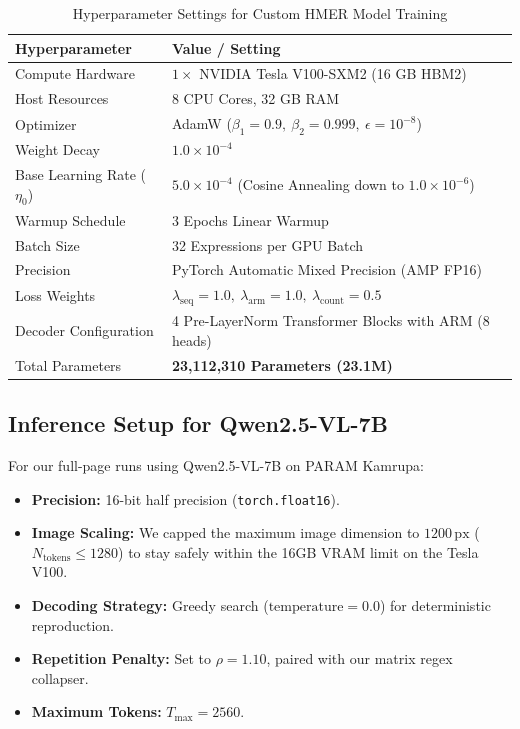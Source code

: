 \begin{table}[htbp]
\centering
\caption{Hyperparameter Settings for Custom HMER Model Training}
\label{tab:training_hyperparams}
\vspace{0.2cm}
\small
\begin{tabular}{ll}
\toprule
\textbf{Hyperparameter} & \textbf{Value / Setting} \\
\midrule
Compute Hardware & $1 \times$ NVIDIA Tesla V100-SXM2 (16 GB HBM2) \\
Host Resources & 8 CPU Cores, 32 GB RAM \\
Optimizer & AdamW ($\beta_1 = 0.9, \ \beta_2 = 0.999, \ \epsilon = 10^{-8}$) \\
Weight Decay & $1.0 \times 10^{-4}$ \\
Base Learning Rate ($\eta_0$) & $5.0 \times 10^{-4}$ (Cosine Annealing down to $1.0 \times 10^{-6}$) \\
Warmup Schedule & 3 Epochs Linear Warmup \\
Batch Size & 32 Expressions per GPU Batch \\
Precision & PyTorch Automatic Mixed Precision (AMP FP16) \\
Loss Weights & $\lambda_{\text{seq}} = 1.0, \ \lambda_{\text{arm}} = 1.0, \ \lambda_{\text{count}} = 0.5$ \\
Decoder Configuration & 4 Pre-LayerNorm Transformer Blocks with ARM (8 heads) \\
Total Parameters & \textbf{23,112,310 Parameters (23.1M)} \\
\bottomrule
\end{tabular}
\end{table}

\subsection{Inference Setup for Qwen2.5-VL-7B}
For our full-page runs using Qwen2.5-VL-7B on PARAM Kamrupa:
\begin{itemize}
    \item \textbf{Precision:} 16-bit half precision (\texttt{torch.float16}).
    \item \textbf{Image Scaling:} We capped the maximum image dimension to $1200\,\text{px}$ ($N_{\text{tokens}} \le 1280$) to stay safely within the 16GB VRAM limit on the Tesla V100.
    \item \textbf{Decoding Strategy:} Greedy search ($\text{temperature} = 0.0$) for deterministic reproduction.
    \item \textbf{Repetition Penalty:} Set to $\rho = 1.10$, paired with our matrix regex collapser.
    \item \textbf{Maximum Tokens:} $T_{\text{max}} = 2560$.
\end{itemize}


